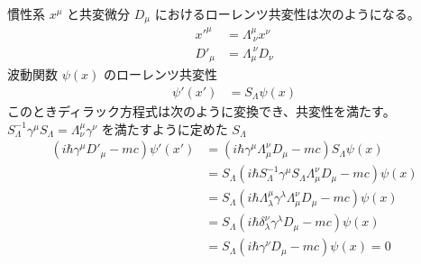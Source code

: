 \documentclass[uplatex,dvipdfmx,a4paper,11pt]{jlreq}
\numberwithin{equation}{section}
\theoremstyle{definition}
\begin{document}
慣性系 $x^\mu$ と共変微分 $D_\mu$ におけるローレンツ共変性は次のようになる。
\begin{align}
  x'^\mu & = \Lambda^\mu_{\ \nu}x^\nu \\
  D'_\mu & = \Lambda_\mu^{\ \nu}D_\nu
\end{align}
波動関数 $\psi(x)$ のローレンツ共変性
\begin{align}
  \psi'(x') & = S_\Lambda\psi(x)
\end{align}
このときディラック方程式は次のように変換でき、共変性を満たす。
$S_\Lambda^{-1}\gamma^\mu S_\Lambda = \Lambda_\nu^\mu\gamma^\nu$ を満たすように定めた $S_\Lambda$
\begin{align}
  (i\hbar\gamma^\mu D'_\mu - mc)\psi'(x') & = (i\hbar\gamma^\mu \Lambda^\nu_\mu D_\mu - mc)S_\Lambda\psi(x)                           \\
                                          & = S_\Lambda(i\hbar S_\Lambda^{-1}\gamma^\mu S_\Lambda\Lambda_\mu^\nu D_\mu - mc)\psi(x)   \\
                                          & = S_\Lambda(i\hbar\Lambda_{\lambda}^{\mu}\gamma^\lambda\Lambda_\mu^\nu D_\mu - mc)\psi(x) \\
                                          & = S_\Lambda(i\hbar\delta_{\lambda}^\nu\gamma^\lambda D_\mu - mc)\psi(x)                   \\
                                          & = S_\Lambda(i\hbar\gamma^\nu D_\mu - mc)\psi(x) = 0
\end{align}
\end{document}
